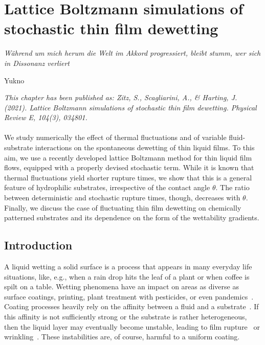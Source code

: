 \chapter{Lattice Boltzmann simulations of stochastic thin film dewetting}
\label{chapter:second_paper}
\epigraph{\textit{Während um mich herum die Welt im Akkord progressiert, bleibt stumm, wer sich in Dissonanz verliert}}{Yukno}

\textit{\small{This chapter has been published as: Zitz, S., Scagliarini, A., \& Harting, J. (2021). Lattice Boltzmann simulations of stochastic thin film dewetting. Physical Review E, 104(3), 034801.}}
\\
\\

We study numerically the effect of thermal fluctuations and of variable fluid-substrate interactions on the spontaneous dewetting of thin liquid films.
To this aim, we use a recently developed lattice Boltzmann method for thin liquid film flows, equipped with a properly devised stochastic term.
While it is known that thermal fluctuations yield shorter rupture times, we show that this is a general feature of hydrophilic substrates, irrespective of the contact angle $\theta$.
The ratio between deterministic and stochastic rupture times, though, decreases with $\theta$. 
Finally, we discuss the case of fluctuating thin film dewetting on chemically patterned substrates and its dependence on the form of the wettability gradients.

\section{Introduction}\label{sec:intro}
A liquid wetting a solid surface is a process that appears in many everyday life situations, like, e.g., when a rain drop hits the leaf of a plant or when coffee is spilt on a table.
Wetting phenomena have an impact on areas as diverse as surface coatings, printing, plant treatment with pesticides, or even pandemics~\cite{oronLongscaleEvolutionThin1997, snoeijerMovingContactLines2013, cassieWettabilityPorousSurfaces1944, lenormandLiquidsPorousMedia1990,deryckGravityInertiaEffects1998, quereFluidCoatingFiber1999,bergeronControllingDropletDeposition2000,bhardwajLikelihoodSurvivalCoronavirus2020}.
Coating processes heavily rely on the affinity between a fluid and a substrate~\cite{bonnWettingSpreading2009}.
If this affinity is not sufficiently strong or the substrate is rather heterogeneous, then the liquid layer may eventually become unstable, leading to film rupture~\cite{oronLongscaleEvolutionThin1997, crasterDynamicsStabilityThin2009} or wrinkling~\cite{dasilvasobrinhoStudyDefectsUltrathin1999}. 
These instabilities are, of course, harmful to a uniform coating.


